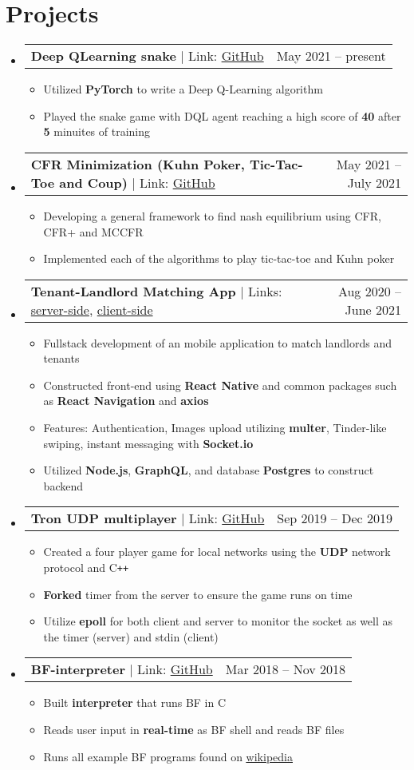 \documentclass[letterpaper,11pt]{article}
\makeatletter
\newcommand{\resumeItem}[1]{
  \item\small{
    {#1 \vspace{-2pt}}
  }
}
\newcommand{\resumeProjectHeading}[2]{
    \item
    \begin{tabular*}{0.97\textwidth}{l@{\extracolsep{\fill}}r}
      \small#1 & #2 \\
    \end{tabular*}\vspace{-7pt}
}
\newcommand{\resumeSubHeadingListStart}{\begin{itemize}[leftmargin=0.15in, label={}]}
\newcommand{\resumeSubHeadingListEnd}{\end{itemize}}
\newcommand{\resumeItemListStart}{\begin{itemize}}
\newcommand{\resumeItemListEnd}{\end{itemize}\vspace{-5pt}}
\makeatother
\begin{document}




\section{Projects}
    \resumeSubHeadingListStart
      \resumeProjectHeading
        {\textbf{Deep QLearning snake} $|$ Link: \href{https://github.com/JaLnYn/pokerbot}{GitHub}}{May 2021 -- present}
        \resumeItemListStart
          \resumeItem{Utilized \textbf{PyTorch} to write a Deep Q-Learning algorithm}
          \resumeItem{Played the snake game with DQL agent reaching a high score of \textbf{40} after \textbf{5} minuites of training}
        \resumeItemListEnd
        \resumeProjectHeading
        {\textbf{CFR Minimization (Kuhn Poker, Tic-Tac-Toe and Coup)} $|$ Link: \href{https://github.com/JaLnYn/pokerbot}{GitHub}}{May 2021 -- July 2021}
        \resumeItemListStart
          \resumeItem{Developing a general framework to find nash equilibrium using CFR, CFR+ and MCCFR}
          \resumeItem{Implemented each of the algorithms to play tic-tac-toe and Kuhn poker}
        \resumeItemListEnd
        \resumeProjectHeading
          {\textbf{Tenant-Landlord Matching App} $|$ Links: \href{https://github.com/JaLnYn/pk2_ser}{server-side}, \href{https://github.com/JaLnYn/pk2_cli}{client-side}}{Aug 2020 -- June 2021}
          \resumeItemListStart
            \resumeItem{Fullstack development of an mobile application to match landlords and tenants}
            \resumeItem{Constructed front-end using \textbf{React Native} and common packages such as \textbf{React Navigation} and \textbf{axios}}
            \resumeItem{Features: Authentication, Images upload utilizing \textbf{multer}, Tinder-like swiping, instant messaging with \textbf{Socket.io}}
            \resumeItem{Utilized \textbf{Node.js}, \textbf{GraphQL}, and database \textbf{Postgres} to construct backend}
          \resumeItemListEnd
      \resumeProjectHeading
        {\textbf{Tron UDP multiplayer} $|$ Link: \href{https://github.com/JaLnYn/Tron}{GitHub}}{Sep 2019 -- Dec 2019}
        \resumeItemListStart
          \resumeItem{Created a four player game for local networks using the \textbf{UDP} network protocol and C\texttt{++}}
          \resumeItem{\textbf{Forked} timer from the server to ensure the game runs on time}
          \resumeItem{Utilize \textbf{epoll} for both client and server to monitor the socket as well as the timer (server) and stdin (client)}
        \resumeItemListEnd
      \resumeProjectHeading
        {\textbf{BF-interpreter} $|$ Link: \href{https://github.com/JaLnYn/Bf-interpreter}{GitHub}}{Mar 2018 -- Nov 2018}
        \resumeItemListStart
          \resumeItem{Built \textbf{interpreter} that runs BF in C}
          \resumeItem{Reads user input in \textbf{real-time} as BF shell and reads BF files}
          \resumeItem{Runs all example BF programs found on \href{https://en.wikipedia.org/wiki/Esoteric_programming_language\#Binary_lambda_calculus}{\underline{wikipedia}}}
        \resumeItemListEnd
    \resumeSubHeadingListEnd
\end{document}
